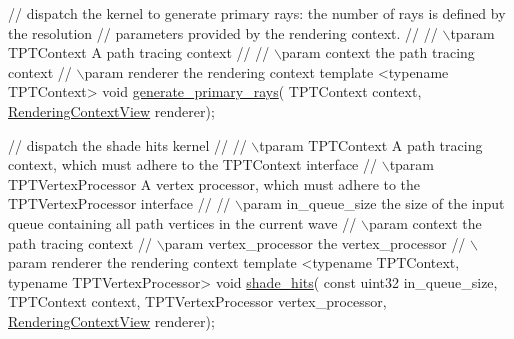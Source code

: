 \begin{DoxyCode}
\textcolor{comment}{// dispatch the kernel to generate primary rays: the number of rays is defined by the resolution}
\textcolor{comment}{// parameters provided by the rendering context.}
\textcolor{comment}{//}
\textcolor{comment}{// \(\backslash\)tparam TPTContext           A path tracing context}
\textcolor{comment}{//}
\textcolor{comment}{// \(\backslash\)param context               the path tracing context}
\textcolor{comment}{// \(\backslash\)param renderer              the rendering context}
\textcolor{keyword}{template} <\textcolor{keyword}{typename} TPTContext>
\textcolor{keywordtype}{void} \hyperlink{group___p_t_lib_ga66602a846711dc021ed0b930846ea596}{generate\_primary\_rays}(
    TPTContext              context,
    \hyperlink{struct_rendering_context_view}{RenderingContextView}    renderer);

\textcolor{comment}{// dispatch the shade hits kernel}
\textcolor{comment}{//}
\textcolor{comment}{// \(\backslash\)tparam TPTContext           A path tracing context, which must adhere to the TPTContext interface}
\textcolor{comment}{// \(\backslash\)tparam TPTVertexProcessor   A vertex processor, which must adhere to the TPTVertexProcessor interface}
\textcolor{comment}{//}
\textcolor{comment}{// \(\backslash\)param in\_queue\_size         the size of the input queue containing all path vertices in the current
       wave}
\textcolor{comment}{// \(\backslash\)param context               the path tracing context}
\textcolor{comment}{// \(\backslash\)param vertex\_processor      the vertex\_processor}
\textcolor{comment}{// \(\backslash\)param renderer              the rendering context}
\textcolor{keyword}{template} <\textcolor{keyword}{typename} TPTContext, \textcolor{keyword}{typename} TPTVertexProcessor>
\textcolor{keywordtype}{void} \hyperlink{group___p_t_lib_ga303934170f8bdcf0d8c674d7bc2f2513}{shade\_hits}(
    \textcolor{keyword}{const} uint32            in\_queue\_size,
    TPTContext              context,
    TPTVertexProcessor      vertex\_processor,
    \hyperlink{struct_rendering_context_view}{RenderingContextView}    renderer);


\end{DoxyCode}
